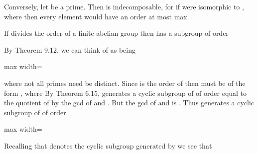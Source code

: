 \documentclass[11pt,oneside]{article}
\begin{document}
\begin{BookBody}

Conversely, let  be a prime. Then  is indecomposable, for if  were isomorphic to , where  then every element would have an order at most max\BookEnd{\blacklozenge}

 If  divides the order of a finite abelian group  then  has a subgroup of order 

 By Theorem 9.12, we can think of  as being

\begin{center}\begin{adjustbox}{max width=\linewidth}\end{adjustbox}\end{center}

\noindent where not all primes  need be distinct. Since  is the order of  then  must be of the form , where  By Theorem 6.15,  generates a cyclic subgroup of  of order equal to the quotient of  by the gcd of  and . But the gcd of  and  is . Thus  generates a cyclic subgroup of  of order

\begin{center}\begin{adjustbox}{max width=\linewidth}\end{adjustbox}\end{center}

\noindent Recalling that  denotes the cyclic subgroup generated by  we see that


\end{BookBody}
\end{document}
